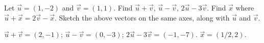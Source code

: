
\begin{Exercise}[
name={},
title={}, 
difficulty=0,
origin={\cite{GHC}}]
Let $\vec u = (1,-2)$ and $\vec v= (1,1)$. 
\Question Find $\vec u+\vec v$, $\vec u-\vec v$, $2\vec u-3\vec v$.
\Question Find $\vec x$ where $\vec u+\vec x = 2\vec v-\vec x$.
\Question Sketch the above vectors on the same axes, along with $\vec u$ and $\vec v$.


\end{Exercise}
\begin{Answer}
\Question $\vec u+\vec v = (2,-1)$; $\vec u -\vec v = (0,-3)$; $2\vec u-3\vec v = ( -1,-7)$.
\Question $\vec x = (1/2,2)$.
\end{Answer}
